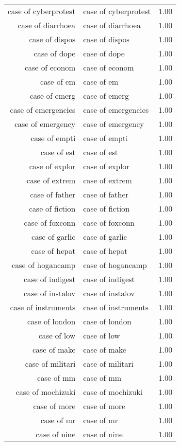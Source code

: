 \begin{table}[ht]
\begin{tabular}{rlr}
  case of cyberprotest & case of cyberprotest & 1.00 \\ 
  case of diarrhoea & case of diarrhoea & 1.00 \\ 
  case of dispos & case of dispos & 1.00 \\ 
  case of dope & case of dope & 1.00 \\ 
  case of econom & case of econom & 1.00 \\ 
  case of em & case of em & 1.00 \\ 
  case of emerg & case of emerg & 1.00 \\ 
  case of emergencies & case of emergencies & 1.00 \\ 
  case of emergency & case of emergency & 1.00 \\ 
  case of empti & case of empti & 1.00 \\ 
  case of est & case of est & 1.00 \\ 
  case of explor & case of explor & 1.00 \\ 
  case of extrem & case of extrem & 1.00 \\ 
  case of father & case of father & 1.00 \\ 
  case of fiction & case of fiction & 1.00 \\ 
  case of foxconn & case of foxconn & 1.00 \\ 
  case of garlic & case of garlic & 1.00 \\ 
  case of hepat & case of hepat & 1.00 \\ 
  case of hogancamp & case of hogancamp & 1.00 \\ 
  case of indigest & case of indigest & 1.00 \\ 
  case of instalov & case of instalov & 1.00 \\ 
  case of instruments & case of instruments & 1.00 \\ 
  case of london & case of london & 1.00 \\ 
  case of low & case of low & 1.00 \\ 
  case of make & case of make & 1.00 \\ 
  case of militari & case of militari & 1.00 \\ 
  case of mm & case of mm & 1.00 \\ 
  case of mochizuki & case of mochizuki & 1.00 \\ 
  case of more & case of more & 1.00 \\ 
  case of mr & case of mr & 1.00 \\ 
  case of nine & case of nine & 1.00 \\ 

\end{tabular}
\end{table}
